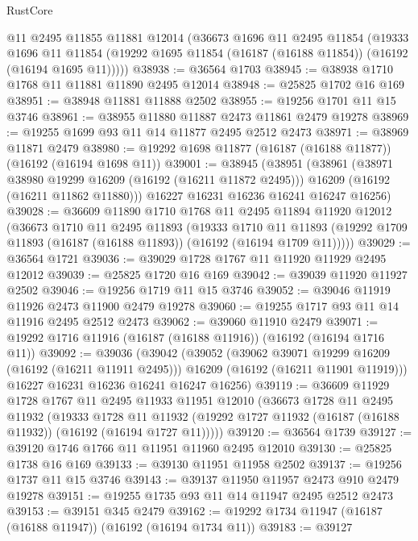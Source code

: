 \begin{lexlean}{RustCore}
\begin{coremodule}
    @11
    @2495
    @11855
    @11881
    @12014
    (@36673
      @1696
      @11
      @2495
      @11854
      (@19333
        @1696
        @11
        @11854
        (@19292 @1695 @11854 (@16187 (@16188 @11854)) (@16192 (@16194 @1695 @11)))))
@38938 := @36564 @1703
@38945 := @38938 @1710 @1768 @11 @11881 @11890 @2495 @12014
@38948 := @25825 @1702 @16 @169
@38951 := @38948 @11881 @11888 @2502
@38955 := @19256 @1701 @11 @15 @3746
@38961 := @38955 @11880 @11887 @2473 @11861 @2479 @19278
@38969 := @19255 @1699 @93 @11 @14 @11877 @2495 @2512 @2473
@38971 := @38969 @11871 @2479
@38980 := @19292 @1698 @11877 (@16187 (@16188 @11877)) (@16192 (@16194 @1698 @11))
@39001 := @38945
    (@38951
      (@38961
        (@38971 @38980 @19299 @16209 (@16192 (@16211 @11872 @2495)))
        @16209
        (@16192 (@16211 @11862 @11880)))
      @16227
      @16231
      @16236
      @16241
      @16247
      @16256)
@39028 := @36609
    @11890
    @1710
    @1768
    @11
    @2495
    @11894
    @11920
    @12012
    (@36673
      @1710
      @11
      @2495
      @11893
      (@19333
        @1710
        @11
        @11893
        (@19292 @1709 @11893 (@16187 (@16188 @11893)) (@16192 (@16194 @1709 @11)))))
@39029 := @36564 @1721
@39036 := @39029 @1728 @1767 @11 @11920 @11929 @2495 @12012
@39039 := @25825 @1720 @16 @169
@39042 := @39039 @11920 @11927 @2502
@39046 := @19256 @1719 @11 @15 @3746
@39052 := @39046 @11919 @11926 @2473 @11900 @2479 @19278
@39060 := @19255 @1717 @93 @11 @14 @11916 @2495 @2512 @2473
@39062 := @39060 @11910 @2479
@39071 := @19292 @1716 @11916 (@16187 (@16188 @11916)) (@16192 (@16194 @1716 @11))
@39092 := @39036
    (@39042
      (@39052
        (@39062 @39071 @19299 @16209 (@16192 (@16211 @11911 @2495)))
        @16209
        (@16192 (@16211 @11901 @11919)))
      @16227
      @16231
      @16236
      @16241
      @16247
      @16256)
@39119 := @36609
    @11929
    @1728
    @1767
    @11
    @2495
    @11933
    @11951
    @12010
    (@36673
      @1728
      @11
      @2495
      @11932
      (@19333
        @1728
        @11
        @11932
        (@19292 @1727 @11932 (@16187 (@16188 @11932)) (@16192 (@16194 @1727 @11)))))
@39120 := @36564 @1739
@39127 := @39120 @1746 @1766 @11 @11951 @11960 @2495 @12010
@39130 := @25825 @1738 @16 @169
@39133 := @39130 @11951 @11958 @2502
@39137 := @19256 @1737 @11 @15 @3746
@39143 := @39137 @11950 @11957 @2473 @910 @2479 @19278
@39151 := @19255 @1735 @93 @11 @14 @11947 @2495 @2512 @2473
@39153 := @39151 @345 @2479
@39162 := @19292 @1734 @11947 (@16187 (@16188 @11947)) (@16192 (@16194 @1734 @11))
@39183 := @39127

\end{coremodule}
\end{lexlean}
